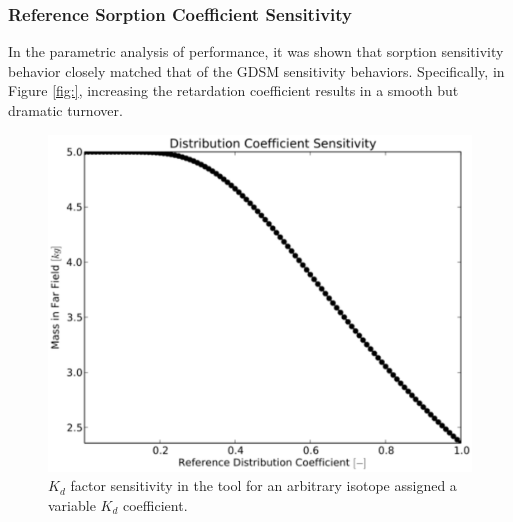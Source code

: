 
\subsubsection{Reference Sorption Coefficient Sensitivity}

In the parametric analysis of \Cyder performance, it was shown that sorption 
sensitivity behavior closely matched that of the \gls{GDSM} sensitivity 
behaviors. Specifically, in Figure \ref{fig:}, increasing the retardation 
coefficient results in a smooth but dramatic turnover. 

\begin{figure}[ht]
\centering
\includegraphics[width=0.7\linewidth]{./chapters/demonstration/bench/kd.eps}
\caption{$K_d$ factor sensitivity in the \Cyder tool for an arbitrary isotope 
assigned a variable $K_d$ coefficient.} 
\label{fig:kd_result}
\end{figure}
